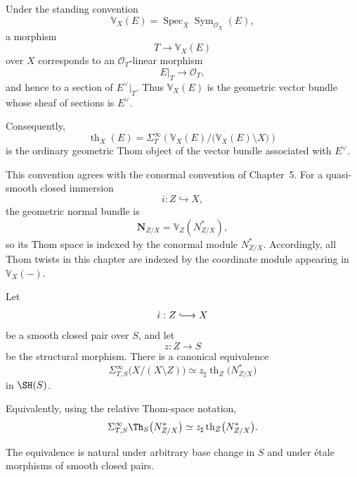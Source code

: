 \begin{remark}
\label{rem:thom-dual-convention}
Under the standing convention
\[
    \mathbb V_X(E)
    =
    \operatorname{Spec}_X
    \operatorname{Sym}_{\mathcal O_X}(E),
\]
a morphism
\[
    T\longrightarrow\mathbb V_X(E)
\]
over \(X\) corresponds to an \(\mathcal O_T\)-linear morphism
\[
    E|_T\longrightarrow\mathcal O_T,
\]
and hence to a section of \(E^\vee|_T\).  Thus
\(\mathbb V_X(E)\) is the geometric vector bundle whose sheaf of sections is
\(E^\vee\).

Consequently,
\[
    \operatorname{th}_X(E)
    =
    \Sigma_T^\infty
    \left(
      \mathbb V_X(E)/
      \bigl(\mathbb V_X(E)\setminus X\bigr)
    \right)
\]
is the ordinary geometric Thom object of the vector bundle associated with
\(E^\vee\).

This convention agrees with the conormal convention of Chapter~5.  For a
quasi-smooth closed immersion
\[
    i:Z\hookrightarrow X,
\]
the geometric normal bundle is
\[
    \mathbf N_{Z/X}
    =
    \mathbb V_Z(N^*_{Z/X}),
\]
so its Thom space is indexed by the conormal module \(N^*_{Z/X}\).
Accordingly, all Thom twists in this chapter are indexed by the coordinate
module appearing in \(\mathbb V_X(-)\).
\end{remark}

\begin{theorem}
\label{thm:stable-homotopy-purity}
Let
\[
    i:Z\lhook\joinrel\longrightarrow X
\]
be a smooth closed pair over \(S\), and let
\[
    z:Z\longrightarrow S
\]
be the structural morphism.  There is a canonical equivalence
\[
    \Sigma_{T,S}^\infty
    \bigl(
      X/(X\setminus Z)
    \bigr)
    \simeq
    z_\sharp
    \operatorname{th}_Z
    \bigl(
      N^*_{Z/X}
    \bigr)
\]
in \(\SH(S)\).

Equivalently, using the relative Thom-space notation,
\[
    \Sigma_{T,S}^\infty
    \Th_S
    \bigl(
      N^*_{Z/X}
    \bigr)
    \simeq
    z_\sharp
    \operatorname{th}_Z
    \bigl(
      N^*_{Z/X}
    \bigr).
\]

The equivalence is natural under arbitrary base change in \(S\) and under
\'{e}tale morphisms of smooth closed pairs.
\end{theorem}

